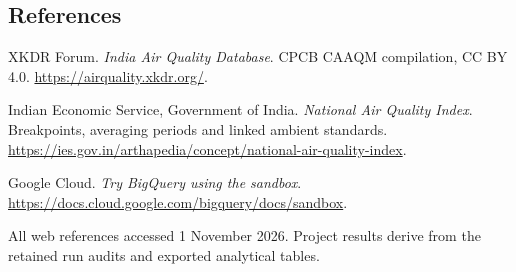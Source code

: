\documentclass[11pt,a4paper]{article}
\begin{document}
\subsection*{References}
\begin{enumerate}[label={[\arabic*]}]
\item XKDR Forum. \emph{India Air Quality Database}. CPCB CAAQM compilation, CC BY 4.0. \url{https://airquality.xkdr.org/}.
\item Indian Economic Service, Government of India. \emph{National Air Quality Index}. Breakpoints, averaging periods and linked ambient standards. \url{https://ies.gov.in/arthapedia/concept/national-air-quality-index}.
\item Google Cloud. \emph{Try BigQuery using the sandbox}. \url{https://docs.cloud.google.com/bigquery/docs/sandbox}.
\end{enumerate}
\small All web references accessed 1 November 2026. Project results derive from the retained run audits and exported analytical tables.
\end{document}
